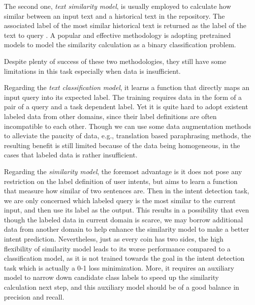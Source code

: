 The second one, \emph{text similarity model}, is usually employed to calculate how similar between an input text and a historical text in the repository. 
The associated label of the most similar historical text is returned as the label of the text to query \cite{jafarpour2010filter, leuski2011npceditor}. 
A popular and effective methodology is adopting pretrained models to model the similarity calculation as a binary classification problem.

Despite plenty of success of these two methodologies, they still have some limitations in this task especially when data is insufficient.

Regarding the \emph{text classification model}, it learns a function that directly maps an input query into its expected label.
The training requires data in the form of a pair of a query and a task dependent label. 
Yet it is quite hard to adopt existent labeled data from other domains, since their label definitions are often incompatible to each other. 
Though we can use some data augmentation methods to alleviate the paucity of data, e.g., translation based paraphrasing methods, the resulting benefit is still limited because of the data being homogeneous, in the cases that labeled data is rather insufficient.

Regarding the \emph{similarity model}, the foremost advantage is it does not pose any restriction on the label definition of user intents, but aims to learn a function that measure how similar of two sentences are. 
Then in the intent detection task, we are only concerned which labeled query is the most similar to the current input, and then use its label as the output.
This results in a possibility that even though the labeled data in current domain is scarce, we may borrow additional data from another domain to help enhance the similarity model to make a better intent prediction.
Nevertheless, just as every coin has two sides, the high flexibility of similarity model leads to its worse performance compared to a classification model, as it is not trained towards the goal in the intent detection task which is actually a 0-1 loss minimization.
More, it requires an auxiliary model to narrow down candidate class labels to speed up the similarity calculation next step, and this auxiliary model should be of a good balance in precision and recall. 

